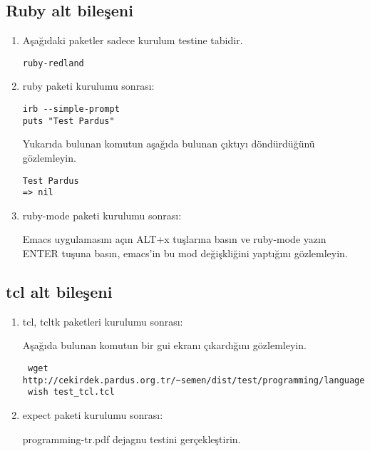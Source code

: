 \documentclass[a4paper,10pt]{article}
\begin{document}
\subsection{Ruby alt bileşeni}

\begin{enumerate}
\item Aşağıdaki paketler sadece kurulum testine tabidir.
\begin{verbatim}
ruby-redland
\end{verbatim}


 \item ruby paketi kurulumu sonrası:

\begin{verbatim}
irb --simple-prompt 
puts "Test Pardus"
\end{verbatim}

Yukarıda bulunan komutun aşağıda bulunan çıktıyı döndürdüğünü gözlemleyin.
\begin{verbatim}
Test Pardus
=> nil
\end{verbatim}

\item ruby-mode paketi kurulumu sonrası:

Emacs uygulamasını açın ALT+x tuşlarına basın ve ruby-mode yazın ENTER tuşuna basın, emacs'in bu mod değişkliğini yaptığını gözlemleyin.
\end{enumerate}

\subsection{tcl alt bileşeni}

\begin{enumerate}
 \item tcl, tcltk paketleri kurulumu sonrası:

Aşağıda bulunan komutun bir gui ekranı çıkardığını gözlemleyin.
\begin{verbatim}
 wget http://cekirdek.pardus.org.tr/~semen/dist/test/programming/language/test_tcl.tcl
 wish test_tcl.tcl
\end{verbatim}

\item expect paketi kurulumu sonrası:

programming-tr.pdf dejagnu testini gerçekleştirin.
\end{enumerate}
\end{document}
